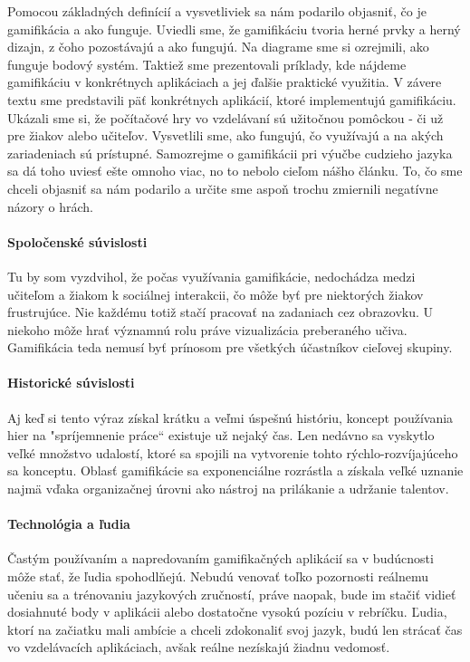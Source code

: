 \documentclass{article}
\begin{document}
Pomocou základných definícií a vysvetliviek sa nám podarilo objasniť, čo je gamifikácia a ako funguje. Uviedli sme, že gamifikáciu tvoria herné prvky a herný dizajn, z čoho pozostávajú a ako fungujú. Na diagrame sme si ozrejmili, ako funguje bodový systém. Taktiež sme prezentovali príklady, kde nájdeme gamifikáciu v konkrétnych aplikáciach a jej ďalšie praktické využitia. V závere textu sme predstavili päť konkrétnych aplikácií, ktoré implementujú gamifikáciu. Ukázali sme si, že počítačové hry vo vzdelávaní sú užitočnou pomôckou - či už pre žiakov alebo učiteľov. Vysvetlili sme, ako fungujú, čo využívajú a na akých zariadeniach sú prístupné. Samozrejme o gamifikácii pri výučbe cudzieho jazyka sa dá toho uviesť ešte omnoho viac, no to nebolo cieľom nášho článku. To, čo sme chceli objasniť sa nám podarilo a určite sme aspoň trochu zmiernili negatívne názory o hrách.

\paragraph{Spoločenské súvislosti} Tu by som vyzdvihol, že počas využívania gamifikácie, nedochádza medzi učiteľom a žiakom k sociálnej interakcii, čo môže byť pre niektorých žiakov frustrujúce. Nie každému totiž stačí pracovať na zadaniach cez obrazovku. U niekoho môže hrať významnú rolu práve vizualizácia preberaného učiva. Gamifikácia teda nemusí byť prínosom pre všetkých účastníkov cieľovej skupiny.

\paragraph{Historické súvislosti} Aj keď si tento výraz získal krátku a veľmi úspešnú históriu, koncept používania hier na "spríjemnenie práce“ existuje už nejaký čas. Len nedávno sa vyskytlo veľké množstvo udalostí, ktoré sa spojili na vytvorenie tohto rýchlo-rozvíjajúceho sa konceptu. Oblasť gamifikácie sa exponenciálne rozrástla a získala veľké uznanie najmä vďaka organizačnej úrovni ako nástroj na prilákanie a udržanie talentov.

\paragraph{Technológia a ľudia} Častým používaním a napredovaním gamifikačných aplikácií sa v budúcnosti môže stať, že ľudia spohodlňejú. Nebudú venovať toľko pozornosti reálnemu učeniu sa a trénovaniu jazykových zručností, práve naopak, bude im stačiť vidieť dosiahnuté body v aplikácii alebo dostatočne vysokú pozíciu v rebríčku. Ľudia, ktorí na začiatku mali ambície a chceli zdokonaliť svoj jazyk, budú len strácať čas vo vzdelávacích aplikáciach, avšak reálne nezískajú žiadnu vedomosť.


 
\end{document}

